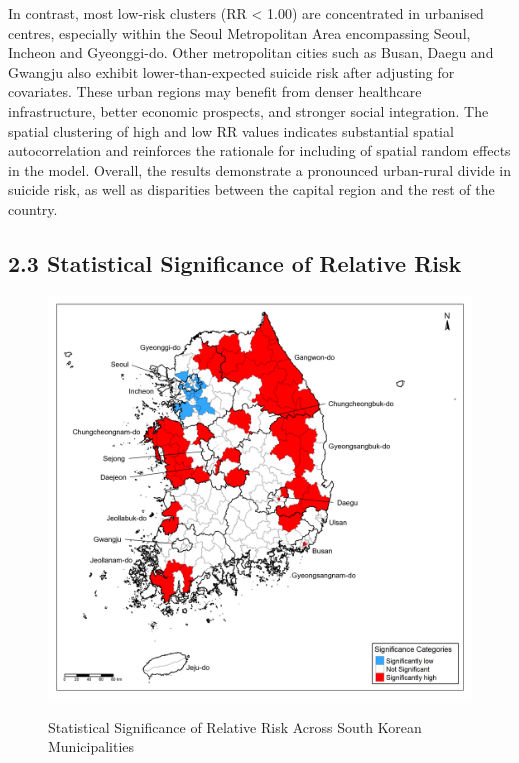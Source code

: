 \documentclass[11pt]{article}
\begin{document}
	In contrast, most low-risk clusters (RR < 1.00) are concentrated in urbanised centres, especially within the Seoul Metropolitan Area encompassing Seoul, Incheon and Gyeonggi-do. Other metropolitan cities such as Busan, Daegu and Gwangju also exhibit lower-than-expected suicide risk after adjusting for covariates. These urban regions may benefit from denser healthcare infrastructure, better economic prospects, and stronger social integration. The spatial clustering of high and low RR values indicates substantial spatial autocorrelation and reinforces the rationale  for including of spatial random effects in the model. Overall, the results demonstrate a pronounced urban-rural divide in suicide risk, as well as disparities between the capital region and the rest of the country.

	\subsection*{2.3 Statistical Significance of Relative Risk}
	
	\begin{figure}[H]
		\centering
		\caption{Statistical Significance of Relative Risk Across South Korean Municipalities}
		\includegraphics[width=1\textwidth]{assets/significance_categories/significance_categories_map_2022_annotated.png}
		\label{fig:significance_map}
	\end{figure}
\end{document}
